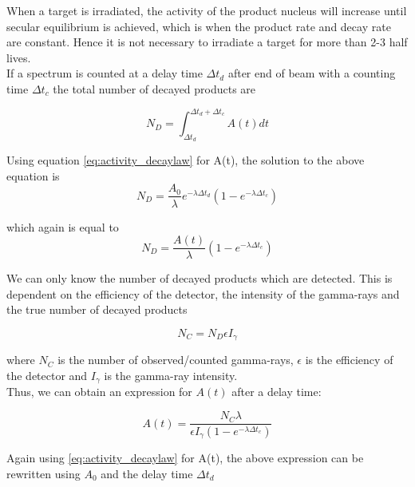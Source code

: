 \documentclass[a4paper,11pt,twoside]{book}
\begin{document}
\noindent 
When a target is irradiated, the activity of the product nucleus will increase until secular equilibrium is achieved, which is when the product rate and decay rate are constant. Hence it is not necessary to irradiate a target for more than 2-3 half lives.\\

\noindent 
If a spectrum is counted at a delay time $\Delta t_d$ after end of beam with a counting time $\Delta t_c$  the total number of decayed products are 

\begin{equation}
    N_D = \int_{\Delta t_d}^{\Delta t_d + \Delta t_c} A(t) dt
\end{equation}

Using equation \ref{eq:activity_decaylaw} for A(t), the solution to the above equation is 
\begin{equation} \label{eq:numb_of_decayed}
    N_D= \frac{A_0}{\lambda}e^{-\lambda \Delta t_d}(1-e^{-\lambda \Delta t_c})
\end{equation}

which again is equal to
\begin{equation}
    N_D = \frac{A(t)}{\lambda} (1-e^{-\lambda \Delta t_c})
\end{equation}

We can only know the number of decayed products which are detected. This is dependent on the efficiency of the detector, the intensity of the gamma-rays and the true number of decayed products

\begin{equation}\label{eq:Ngamma}
    N_C  = N_D \epsilon I_\gamma
\end{equation}

where $N_C$ is the number of observed/counted gamma-rays, $\epsilon$ is the efficiency of the detector and $I_\gamma$ is the gamma-ray intensity.\\ 

\noindent
Thus, we can obtain an expression for $A(t)$ after a delay time: 

\begin{equation} \label{eq:Final_Expression_A}
    A(t) = \frac{N_C \lambda}{\epsilon I_\gamma (1-e^{-\lambda \Delta t_c})}
\end{equation}

\noindent 
Again using \ref{eq:activity_decaylaw} for A(t), the above expression can be rewritten using $A_0$ and the delay time $\Delta t_d$
\end{document}
